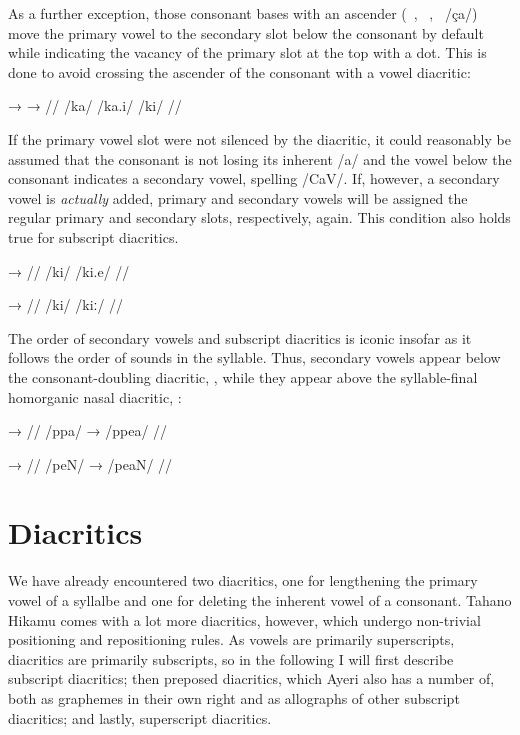 As a further exception, those consonant bases with an ascender 
(~, ~, ~/ça/) move the primary vowel to 
the secondary slot below the consonant by default while indicating the vacancy 
of the primary slot at the top with a dot. This is done to avoid crossing the 
ascender of the consonant with a vowel diacritic:

\ex[lingstyle=thex]\begingl
	\gla {}	→		→	 //
	\glb /ka/	{}	/ka.i/		{}	/ki/ //
\endgl\xe

If the primary vowel slot were not silenced by the  diacritic, it 
could reasonably be assumed that the consonant is not losing its inherent /a/ 
and the vowel below the consonant indicates a secondary vowel, spelling /CaV/. 
If, however, a secondary vowel is \emph{actually} added, primary and secondary 
vowels will be assigned the regular primary and secondary slots, respectively, 
again. This condition also holds true for subscript diacritics.

\pex[lingstyle=thex]
\a\begingl
	\gla {}	→	 //
	\glb /ki/	{}	/ki.e/ //
\endgl

\a\begingl
	\gla {}	→	 //
	\glb /ki/	{}	/kiː/ //
\endgl

\xe

The order of secondary vowels and subscript diacritics is iconic insofar as 
it follows the order of sounds in the syllable. Thus, secondary vowels appear 
below the consonant-doubling diacritic, , while they appear above the 
syllable-final homorganic nasal diacritic, :

\pex[lingstyle=thex]\label{ex:subscrord}
\a\begingl
	\gla {}	→	 //
	\glb /ppa/	→	/ppea/ //
\endgl

\a\begingl
	\gla {}	→	 //
	\glb /peN/	→	/peaN/ //
\endgl
\xe


\section{Diacritics}

We have already encountered two diacritics, one for lengthening the 
primary vowel of a syllalbe and one for deleting the inherent vowel of a 
consonant. Tahano Hikamu comes with a lot more diacritics, however, which 
undergo non-trivial positioning and repositioning rules. As vowels are 
primarily superscripts, diacritics are primarily subscripts, so in the 
following I will first describe subscript diacritics; then preposed diacritics, 
which Ayeri also has a number of, both as graphemes in their own right and as 
allographs of other subscript diacritics; and lastly, superscript diacritics.


